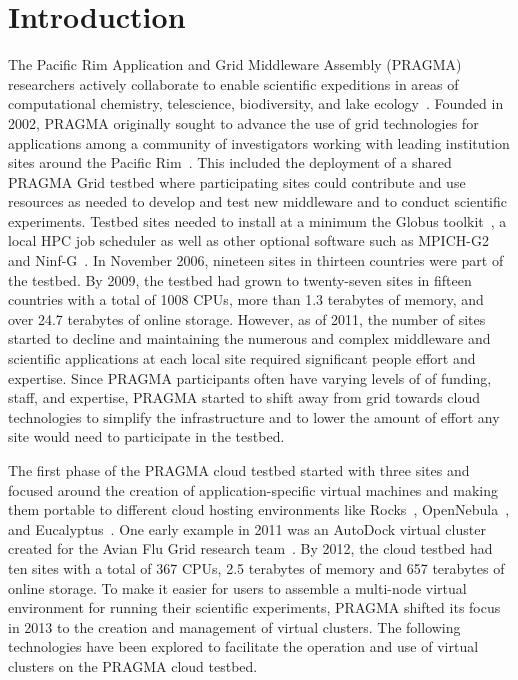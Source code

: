 \documentclass[times]{cpeauth}
\begin{document}


\section{Introduction}
\label{Sec:intro}

The Pacific Rim Application and Grid Middleware Assembly (PRAGMA) researchers actively collaborate to enable scientific expeditions in areas of computational chemistry, telescience, biodiversity, and lake ecology~\cite{pragmaWeb}.  Founded in 2002, PRAGMA originally sought to advance the use of grid technologies for applications among a community of investigators working with leading institution sites around the Pacific Rim~\cite{pragmaReport2004}.  This included the deployment of a shared PRAGMA Grid testbed where participating sites could contribute and use resources as needed to develop and test new middleware and to conduct scientific experiments.  Testbed sites needed to install at a minimum the Globus toolkit~\cite{globus}, a local HPC job scheduler as well as other optional software such as MPICH-G2~\cite{mpichg2} and Ninf-G~\cite{ninfg}.  In November 2006, nineteen sites in thirteen countries were part of the testbed.  By 2009, the testbed had grown to twenty-seven sites in fifteen countries with a total of 1008 CPUs, more than 1.3 terabytes of memory, and over 24.7 terabytes of online storage.  However, as of 2011, the number of sites started to decline and maintaining the numerous and complex middleware and scientific applications at each local site required significant people effort and expertise.  Since PRAGMA participants often have varying levels of of funding, staff, and expertise, PRAGMA started to shift away from grid towards cloud technologies to simplify the infrastructure and to lower the amount of effort any site would need to participate in the testbed.  

The first phase of the PRAGMA cloud testbed started with three sites and focused around the creation of application-specific virtual machines and making them portable to  different cloud hosting environments like Rocks~\cite{rocks}, OpenNebula~\cite{opennebula}, and Eucalyptus~\cite{eucalyptus}.
One early example in 2011 was an AutoDock virtual cluster created for the Avian Flu Grid research team~\cite{pragmaReport2011}.   By 2012, the cloud testbed had ten sites with a total of 367 CPUs, 2.5 terabytes of memory and 657 terabytes of online storage.  To make it easier for users to assemble a multi-node virtual environment for running their scientific experiments, PRAGMA shifted its  focus in 2013 to the creation and management of virtual clusters.  The following technologies have been explored to facilitate the operation and use of virtual clusters on the PRAGMA cloud testbed.
\end{document}
